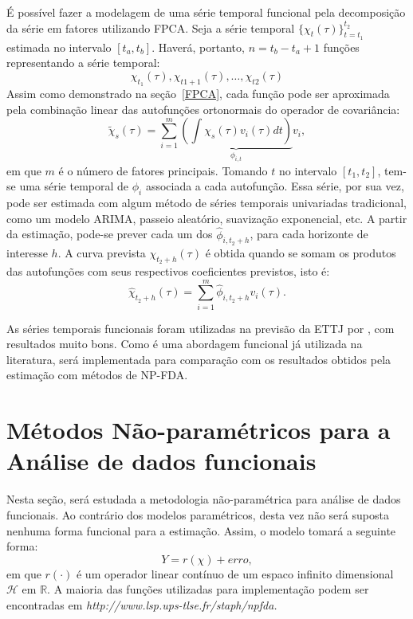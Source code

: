\documentclass[
	12pt,				%
	openright,			%
	oneside,			%
	a4paper,			%
	english,			%
	brazil				%
	]{dissertacao-ufrgs-abntex2}
\begin{document}
É possível fazer a modelagem de uma série temporal funcional pela decomposição da série em fatores utilizando FPCA. Seja a série temporal $\{ \chi_t(\tau) \}_{t=t_1}^{t_2}$ estimada no  intervalo $[t_a,t_b]$. Haverá, portanto, $n=t_b-t_a+1$ funções representando a série temporal:
\begin{equation}
\chi_{t_1}(\tau), \chi_{t1+1}(\tau), \dots, \chi_{t2}(\tau)
\end{equation}
Assim como demonstrado na seção~\ref{FPCA}, cada função pode ser aproximada pela combinação linear das autofunções ortonormais do operador de covariância:
\begin{equation}
\widetilde{\chi}_s(\tau)=\sum_{i=1}^{m}{ \underbrace{ \left(  \int \chi_s(\tau)  v_i(\tau)dt \right) }_{\phi_{i,t}} } v_i,
\end{equation}
em que $m$ é o número de fatores principais.
Tomando $t$ no intervalo $[t_1,t_2]$, tem-se uma série temporal de $\phi_i$ associada a cada autofunção. Essa série, por sua vez, pode ser estimada com algum método de séries temporais univariadas tradicional, como um modelo ARIMA, passeio aleatório, suavização exponencial, etc. A partir da estimação, pode-se prever cada um dos $\hat{\phi}_{i,t_2+h}$, para cada horizonte de interesse $h$. A curva prevista $\chi_{t_2+h}(\tau)$ é obtida quando se somam os produtos das autofunções com seus respectivos coeficientes previstos, isto é:
\begin{equation}
\hat{\chi}_{t_2+h}(\tau)= \sum_{i=1}^{m}{\hat{\phi}_{i,t_2+h} v_i(\tau) }.
\end{equation}

As séries temporais funcionais foram utilizadas na previsão da ETTJ por , com resultados muito bons. Como é uma abordagem funcional já utilizada na literatura, será implementada para comparação com os resultados obtidos pela estimação com métodos de NP-FDA.

\section{Métodos Não-paramétricos para a Análise de dados funcionais}

Nesta seção, será estudada a metodologia não-paramétrica para análise
de dados funcionais. Ao contrário dos modelos paramétricos, desta
vez não será suposta nenhuma forma funcional para a estimação. Assim,
o modelo tomará a seguinte forma:
\[
Y=r(\chi)+erro,
\]
em que $r(\cdot)$ é um operador linear contínuo de um espaco infinito dimensional $\mathcal{H}$
em $\mathbb{R}$. A maioria das funções utilizadas para implementação
podem ser encontradas em \emph{http://www.lsp.ups-tlse.fr/staph/npfda. }
\end{document}
